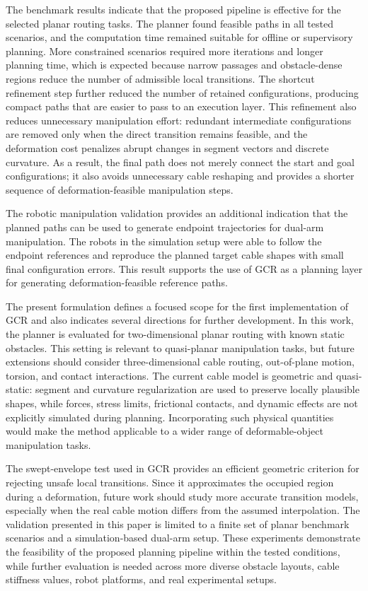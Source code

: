 \documentclass{pas}
\begin{document}
The benchmark results indicate that the proposed pipeline is effective for the selected planar routing tasks. The planner found feasible paths in all tested scenarios, and the computation time remained suitable for offline or supervisory planning. More constrained scenarios required more iterations and longer planning time, which is expected because narrow passages and obstacle-dense regions reduce the number of admissible local transitions. The shortcut refinement step further reduced the number of retained configurations, producing compact paths that are easier to pass to an execution layer. This refinement also reduces unnecessary manipulation effort: redundant intermediate configurations are removed only when the direct transition remains feasible, and the deformation cost penalizes abrupt changes in segment vectors and discrete curvature. As a result, the final path does not merely connect the start and goal configurations; it also avoids unnecessary cable reshaping and provides a shorter sequence of deformation-feasible manipulation steps.

The robotic manipulation validation provides an additional indication that the planned paths
can be used to generate endpoint trajectories for dual-arm manipulation. The
robots in the simulation setup were able to follow the endpoint references and reproduce the
planned target cable shapes with small final configuration errors. This result
supports the use of GCR as a planning layer for generating deformation-feasible
reference paths. 

The present formulation defines a focused scope for the first implementation of
GCR and also indicates several directions for further development. In this work,
the planner is evaluated for two-dimensional planar routing with known static
obstacles. This setting is relevant to quasi-planar manipulation tasks, but
future extensions should consider three-dimensional cable routing, out-of-plane
motion, torsion, and contact interactions. The current cable model is
geometric and quasi-static: segment and curvature regularization are used to
preserve locally plausible shapes, while forces, stress limits, frictional
contacts, and dynamic effects are not explicitly simulated during planning.
Incorporating such physical quantities would make the method applicable to a
wider range of deformable-object manipulation tasks.

The swept-envelope test used in GCR provides an efficient geometric criterion
for rejecting unsafe local transitions. Since it approximates the occupied
region during a deformation, future work should study more accurate transition
models, especially when the real cable motion differs from the assumed
interpolation. The validation presented in this paper is limited to a finite set
of planar benchmark scenarios and a simulation-based dual-arm setup. These
experiments demonstrate the feasibility of the proposed planning pipeline within
the tested conditions, while further evaluation is needed across more diverse
obstacle layouts, cable stiffness values, robot platforms, and real experimental
setups.
\end{document}
